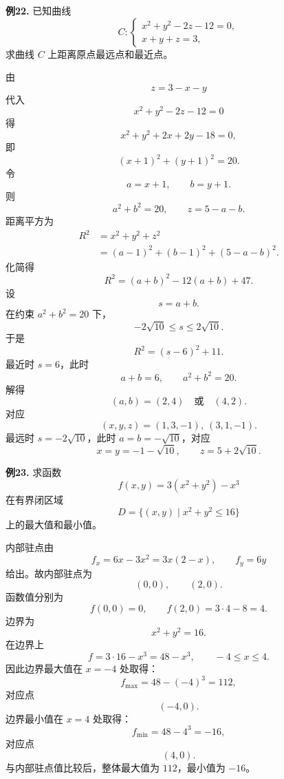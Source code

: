 \begin{problemblock}
\textbf{例22.} 已知曲线
\[
C:\begin{cases}
x^2+y^2-2z-12=0,\\
x+y+z=3,
\end{cases}
\]
求曲线 \(C\) 上距离原点最远点和最近点。
\end{problemblock}
\begin{solutionblock}
由
\[
z=3-x-y
\]
代入
\[
x^2+y^2-2z-12=0
\]
得
\[
x^2+y^2+2x+2y-18=0,
\]
即
\[
(x+1)^2+(y+1)^2=20.
\]
令
\[
a=x+1,\qquad b=y+1.
\]
则
\[
a^2+b^2=20,\qquad z=5-a-b.
\]
距离平方为
\[
\begin{aligned}
R^2&=x^2+y^2+z^2\\
&=(a-1)^2+(b-1)^2+(5-a-b)^2.
\end{aligned}
\]
化简得
\[
R^2=(a+b)^2-12(a+b)+47.
\]
设
\[
s=a+b.
\]
在约束 \(a^2+b^2=20\) 下，
\[
-2\sqrt{10}\le s\le2\sqrt{10}.
\]
于是
\[
R^2=(s-6)^2+11.
\]
最近时 \(s=6\)，此时
\[
a+b=6,\qquad a^2+b^2=20.
\]
解得
\[
(a,b)=(2,4)\quad\text{或}\quad(4,2).
\]
对应
\[
(x,y,z)=(1,3,-1),\ (3,1,-1).
\]
最远时 \(s=-2\sqrt{10}\)，此时 \(a=b=-\sqrt{10}\)，对应
\[
x=y=-1-\sqrt{10},\qquad z=5+2\sqrt{10}.
\]
\end{solutionblock}

\begin{problemblock}
\textbf{例23.} 求函数
\[
f(x,y)=3(x^2+y^2)-x^3
\]
在有界闭区域
\[
D=\{(x,y)\mid x^2+y^2\le16\}
\]
上的最大值和最小值。
\end{problemblock}
\begin{solutionblock}
内部驻点由
\[
f_x=6x-3x^2=3x(2-x),\qquad f_y=6y
\]
给出。故内部驻点为
\[
(0,0),\qquad (2,0).
\]
函数值分别为
\[
f(0,0)=0,\qquad f(2,0)=3\cdot4-8=4.
\]
边界为
\[
x^2+y^2=16.
\]
在边界上
\[
f=3\cdot16-x^3=48-x^3,\qquad -4\le x\le4.
\]
因此边界最大值在 \(x=-4\) 处取得：
\[
f_{\max}=48-(-4)^3=112,
\]
对应点
\[
(-4,0).
\]
边界最小值在 \(x=4\) 处取得：
\[
f_{\min}=48-4^3=-16,
\]
对应点
\[
(4,0).
\]
与内部驻点值比较后，整体最大值为 \(112\)，最小值为 \(-16\)。
\end{solutionblock}
